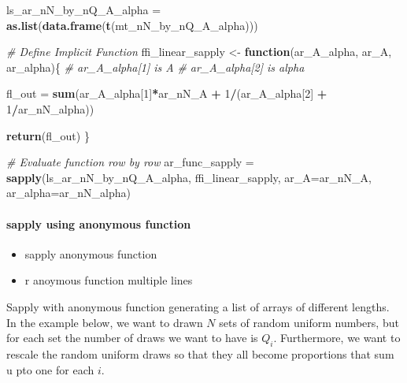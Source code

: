 \documentclass[
]{book}
\newenvironment{Shaded}{\begin{snugshade}}{\end{snugshade}}
\newcommand{\CommentTok}[1]{\textcolor[rgb]{0.56,0.35,0.01}{\textit{#1}}}
\newcommand{\ControlFlowTok}[1]{\textcolor[rgb]{0.13,0.29,0.53}{\textbf{#1}}}
\newcommand{\DataTypeTok}[1]{\textcolor[rgb]{0.13,0.29,0.53}{#1}}
\newcommand{\DecValTok}[1]{\textcolor[rgb]{0.00,0.00,0.81}{#1}}
\newcommand{\KeywordTok}[1]{\textcolor[rgb]{0.13,0.29,0.53}{\textbf{#1}}}
\newcommand{\NormalTok}[1]{#1}
\newcommand{\OperatorTok}[1]{\textcolor[rgb]{0.81,0.36,0.00}{\textbf{#1}}}
\newcommand{\StringTok}[1]{\textcolor[rgb]{0.31,0.60,0.02}{#1}}
\providecommand{\tightlist}{%
  \setlength{\itemsep}{0pt}\setlength{\parskip}{0pt}}
\begin{document}
\begin{Shaded}
\begin{Highlighting}[]
\NormalTok{ls\_ar\_nN\_by\_nQ\_A\_alpha =}\StringTok{ }\KeywordTok{as.list}\NormalTok{(}\KeywordTok{data.frame}\NormalTok{(}\KeywordTok{t}\NormalTok{(mt\_nN\_by\_nQ\_A\_alpha)))}

\CommentTok{\# Define Implicit Function}
\NormalTok{ffi\_linear\_sapply \textless{}{-}}\StringTok{ }\ControlFlowTok{function}\NormalTok{(ar\_A\_alpha, ar\_A, ar\_alpha)\{}
  \CommentTok{\# ar\_A\_alpha[1] is A}
  \CommentTok{\# ar\_A\_alpha[2] is alpha}

\NormalTok{  fl\_out =}\StringTok{ }\KeywordTok{sum}\NormalTok{(ar\_A\_alpha[}\DecValTok{1}\NormalTok{]}\OperatorTok{*}\NormalTok{ar\_nN\_A }\OperatorTok{+}
\StringTok{                 }\DecValTok{1}\OperatorTok{/}\NormalTok{(ar\_A\_alpha[}\DecValTok{2}\NormalTok{] }\OperatorTok{+}\StringTok{ }\DecValTok{1}\OperatorTok{/}\NormalTok{ar\_nN\_alpha))}

  \KeywordTok{return}\NormalTok{(fl\_out)}
\NormalTok{\}}

\CommentTok{\# Evaluate function row by row}
\NormalTok{ar\_func\_sapply =}\StringTok{ }\KeywordTok{sapply}\NormalTok{(ls\_ar\_nN\_by\_nQ\_A\_alpha, ffi\_linear\_sapply,}
                        \DataTypeTok{ar\_A=}\NormalTok{ar\_nN\_A, }\DataTypeTok{ar\_alpha=}\NormalTok{ar\_nN\_alpha)}
\end{Highlighting}
\end{Shaded}

\hypertarget{sapply-using-anonymous-function}{%
\paragraph{sapply using anonymous function}\label{sapply-using-anonymous-function}}

\begin{itemize}
\tightlist
\item
  sapply anonymous function
\item
  r anoymous function multiple lines
\end{itemize}

Sapply with anonymous function generating a list of arrays of different lengths. In the example below, we want to drawn \(N\) sets of random uniform numbers, but for each set the number of draws we want to have is \(Q_i\). Furthermore, we want to rescale the random uniform draws so that they all become proportions that sum u pto one for each \(i\).
\end{document}
